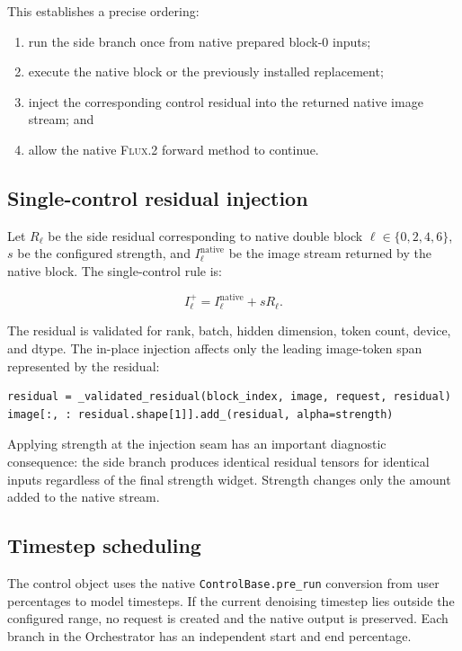 \documentclass[11pt]{article}
\newcommand{\FluxTwo}{\textsc{Flux.2}}
\newcommand{\code}[1]{\texttt{#1}}
\begin{document}
This establishes a precise ordering:

\begin{enumerate}
  \item run the side branch once from native prepared block-0 inputs;
  \item execute the native block or the previously installed replacement;
  \item inject the corresponding control residual into the returned native image stream; and
  \item allow the native \FluxTwo{} forward method to continue.
\end{enumerate}

\subsection{Single-control residual injection}

Let $R_{\ell}$ be the side residual corresponding to native double block $\ell\in\{0,2,4,6\}$, $s$ be the configured strength, and $I_{\ell}^{\mathrm{native}}$ be the image stream returned by the native block. The single-control rule is:

\[
  I_{\ell}^{+}
  = I_{\ell}^{\mathrm{native}} + sR_{\ell}.
\]

The residual is validated for rank, batch, hidden dimension, token count, device, and dtype. The in-place injection affects only the leading image-token span represented by the residual:

\begin{lstlisting}[style=pythonstyle,caption={Validated single-control injection.}]
residual = _validated_residual(block_index, image, request, residual)
image[:, : residual.shape[1]].add_(residual, alpha=strength)
\end{lstlisting}

Applying strength at the injection seam has an important diagnostic consequence: the side branch produces identical residual tensors for identical inputs regardless of the final strength widget. Strength changes only the amount added to the native stream.

\subsection{Timestep scheduling}

The control object uses the native \code{ControlBase.pre\_run} conversion from user percentages to model timesteps. If the current denoising timestep lies outside the configured range, no request is created and the native output is preserved. Each branch in the Orchestrator has an independent start and end percentage.
\end{document}
